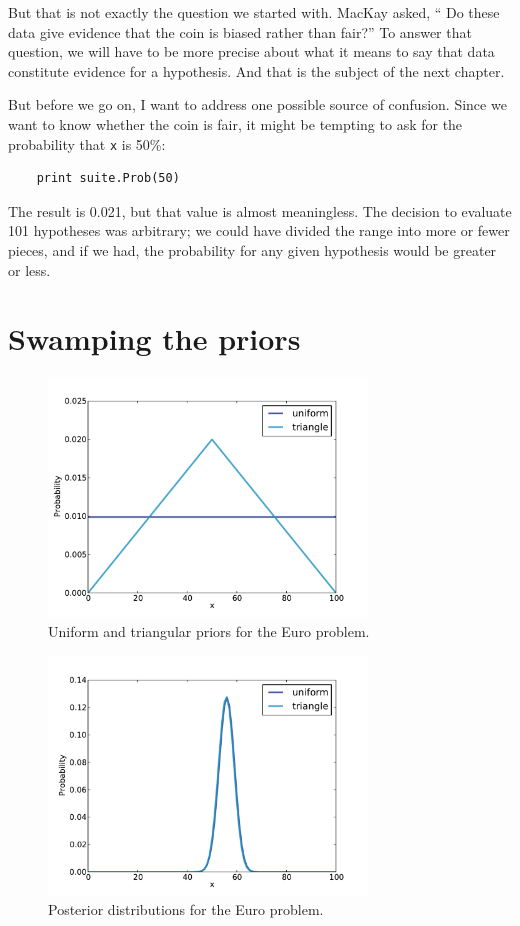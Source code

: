 \documentclass[12pt]{book}
\begin{document}
But that is not exactly the question we started with.  MacKay asked,
`` Do these data give evidence that the coin is biased rather than
fair?''  To answer that question, we will have to be more precise
about what it means to say that data constitute evidence for
a hypothesis.  And that is the subject of the next chapter.

But before we go on, I want to address one possible source of confusion.
Since we want to know whether the coin is fair, it might be tempting
to ask for the probability that {\tt x} is 50\%:

\begin{verbatim}
    print suite.Prob(50)
\end{verbatim}

The result is 0.021, but that value is almost meaningless.  The
decision to evaluate 101 hypotheses was arbitrary; we could have
divided the range into more or fewer pieces, and if we had, the
probability for any given hypothesis would be greater or less.


\section{Swamping the priors}
\label{triangle}

\begin{figure}
\centerline{\includegraphics[height=2.5in]{figs/euro2.pdf}}
\caption{Uniform and triangular priors for the
Euro problem.}
\label{fig.euro2}
\end{figure}

\begin{figure}
\centerline{\includegraphics[height=2.5in]{figs/euro3.pdf}}
\caption{Posterior distributions for the Euro problem.}
\label{fig.euro3}
\end{figure}
\end{document}
